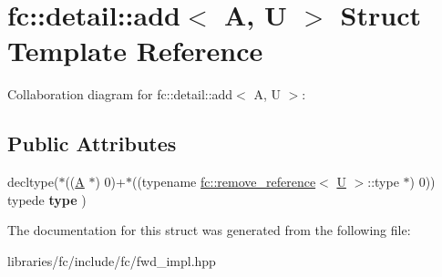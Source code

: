 \hypertarget{structfc_1_1detail_1_1add}{}\section{fc\+:\+:detail\+:\+:add$<$ A, U $>$ Struct Template Reference}
\label{structfc_1_1detail_1_1add}


Collaboration diagram for fc\+:\+:detail\+:\+:add$<$ A, U $>$\+:
\subsection*{Public Attributes}
\begin{DoxyCompactItemize}
\item 
\mbox{\label{structfc_1_1detail_1_1add_a39bdedeef4c3f020e53c2439feeb78ff}} 
decltype($\ast$((\mbox{\hyperlink{struct_a}{A}} $\ast$) 0)+$\ast$((typename \mbox{\hyperlink{structfc_1_1remove__reference}{fc\+::remove\+\_\+reference}}$<$ \mbox{\hyperlink{union_u}{U}} $>$\+::type $\ast$) 0)) typede {\bfseries type} )
\end{DoxyCompactItemize}


The documentation for this struct was generated from the following file\+:\begin{DoxyCompactItemize}
\item 
libraries/fc/include/fc/fwd\+\_\+impl.\+hpp\end{DoxyCompactItemize}
